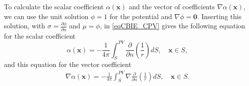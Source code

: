 \documentclass[]{book}
\newcommand{\V}[1]{\boldsymbol{#1}}
\newcommand{\D}[2]{\frac{\partial #1}{\partial #2}}
\begin{document}
To calculate the scalar coefficient $\alpha(\V{x})$ and the vector of coefficients $\nabla \alpha(\V{x})$, we can use the unit solution $\phi = 1$ for the potential and $\nabla \phi = \V{0}$. Inserting this solution, with $\sigma = \D{\phi}{n}$ and $\mu = \phi$, in \eqref{eqCBIE_CPV} gives the following equation for the scalar coefficient
\begin{equation}
\alpha (\V{x}) = - \frac{1}{4 \pi} \int_{S}^{PV} \frac{\partial }{\partial n} \left( \frac{1}{r}\right) dS, \quad \V{x} \in S,
\label{eqCBIE_CPV}
\end{equation}
and this equation for the vector coefficient
\begin{align}
\nabla \alpha(\V{x}) =- \frac{1}{4 \pi} \int_{S}^{PV} \nabla \frac{\partial }{\partial n} \left( \frac{1}{r}\right) dS, \quad \V{x} \in S.
\label{eqHBIE_CPV}
\end{align}
\end{document}
